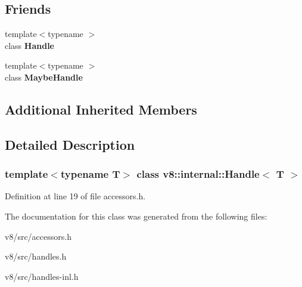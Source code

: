 \subsection*{Friends}
\begin{DoxyCompactItemize}
\item 
\mbox{\label{classv8_1_1internal_1_1Handle_a67ca1a2d91273eaf85fb3d23ba8ce984}} 
{\footnotesize template$<$typename $>$ }\\class {\bfseries Handle}
\item 
\mbox{\label{classv8_1_1internal_1_1Handle_a43ca95cbc5708225727b3674f4690233}} 
{\footnotesize template$<$typename $>$ }\\class {\bfseries Maybe\+Handle}
\end{DoxyCompactItemize}
\subsection*{Additional Inherited Members}


\subsection{Detailed Description}
\subsubsection*{template$<$typename T$>$\newline
class v8\+::internal\+::\+Handle$<$ T $>$}



Definition at line 19 of file accessors.\+h.



The documentation for this class was generated from the following files\+:\begin{DoxyCompactItemize}
\item 
v8/src/accessors.\+h\item 
v8/src/handles.\+h\item 
v8/src/handles-\/inl.\+h\end{DoxyCompactItemize}
